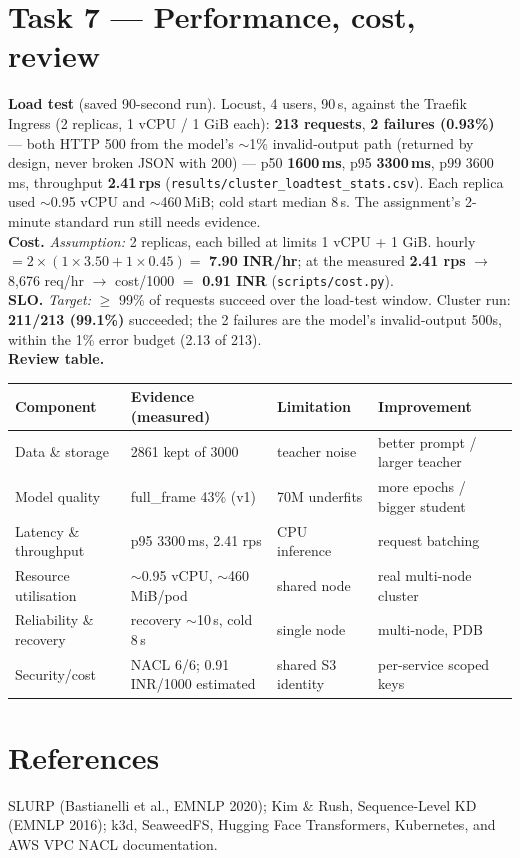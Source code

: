 \documentclass[10pt,a4paper]{article}
\newcommand{\code}[1]{\texttt{\small #1}}
\begin{document}
\section{Task 7 --- Performance, cost, review}
\textbf{Load test} (saved 90-second run). Locust, 4 users, 90\,s, against the Traefik Ingress (2
replicas, 1 vCPU / 1 GiB each): \textbf{213 requests}, \textbf{2 failures (0.93\%)} --- both HTTP 500 from
the model's $\sim$1\% invalid-output path (returned by design, never broken JSON with 200) --- p50
\textbf{1600\,ms}, p95 \textbf{3300\,ms}, p99 3600\,ms, throughput \textbf{2.41\,rps}
(\code{results/cluster\_loadtest\_stats.csv}). Each replica used $\sim$0.95 vCPU and $\sim$460\,MiB; cold
start median 8\,s. The assignment's 2-minute standard run still needs evidence.\\
\textbf{Cost.} \textit{Assumption:} 2 replicas, each billed at limits 1 vCPU + 1 GiB. hourly $= 2 \times
(1{\times}3.50 + 1{\times}0.45) = $ \textbf{7.90 INR/hr}; at the measured \textbf{2.41 rps} $\rightarrow$
8{,}676 req/hr $\rightarrow$ cost/1000 $=$ \textbf{0.91 INR} (\code{scripts/cost.py}).\\
\textbf{SLO.} \textit{Target:} $\geq$ 99\% of requests succeed over the load-test window. Cluster run:
\textbf{211/213 (99.1\%)} succeeded; the 2 failures are the model's invalid-output 500s, within the 1\%
error budget (2.13 of 213).\\
\textbf{Review table.}

\begin{center}\small
\begin{tabular}{p{3.0cm}p{4.3cm}p{3.1cm}p{4.3cm}}
\toprule
Component & Evidence (measured) & Limitation & Improvement \\
\midrule
Data \& storage & 2861 kept of 3000 & teacher noise & better prompt / larger teacher \\
Model quality & full\_frame 43\% (v1) & 70M underfits & more epochs / bigger student \\
Latency \& throughput & p95 3300\,ms, 2.41 rps & CPU inference & request batching \\
Resource utilisation & $\sim$0.95 vCPU, $\sim$460\,MiB/pod & shared node & real multi-node cluster \\
Reliability \& recovery & recovery $\sim$10\,s, cold 8\,s & single node & multi-node, PDB \\
Security/cost & NACL 6/6; 0.91 INR/1000 estimated & shared S3 identity & per-service scoped keys \\
\bottomrule
\end{tabular}
\end{center}

\section{References}
SLURP (Bastianelli et al., EMNLP 2020); Kim \& Rush, Sequence-Level KD (EMNLP 2016); k3d, SeaweedFS, Hugging
Face Transformers, Kubernetes, and AWS VPC NACL documentation.
\end{document}
